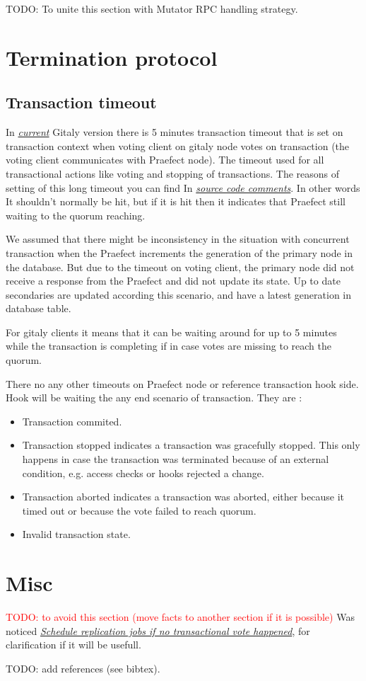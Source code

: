 \documentclass[acmlarge, screen, nonacm]{acmart}
\newcommand{\todo}[1]{\textcolor{red}{TODO: #1}}
\begin{document}
TODO: To unite this section with Mutator RPC handling strategy.

\section{Termination protocol}
\subsection{Transaction timeout}
In \emph{\href{https://gitlab.com/gitlab-org/gitaly/-/tags/v14.0.0-rc1}{ current}} 
Gitaly version there is 5 minutes transaction timeout that is set on transaction 
context when voting client on gitaly node votes on transaction (the voting client 
communicates with Praefect node).
The timeout used for all transactional actions like voting and stopping of transactions.
 The reasons of setting of this long timeout you can find 
In \emph{\href{https://gitlab.com/gitlab-org/gitaly/-/blob/master/internal/gitaly/transaction/manager.go\#L21}{ source code comments}}. 
In other words It shouldn't normally be hit, but if it is hit then it indicates that Praefect still waiting to the quorum reaching. 

We assumed that there might be inconsistency in the situation with concurrent transaction when the Praefect 
increments the generation of the primary node in the database. But due to the timeout on voting client, 
the primary node did not receive a response from the Praefect and did not update its state. 
Up to date secondaries are updated according this scenario, and have a latest generation in database table. 

For gitaly clients it means that it can be waiting around for up to 5 minutes while the transaction 
is completing if in case votes are missing to reach the quorum.

There no any other timeouts on Praefect node or reference transaction hook side. 
Hook will be waiting the any end scenario of transaction. They are :

\begin{itemize}
\item Transaction commited.
\item Transaction stopped indicates a transaction was gracefully stopped. 
This only happens in case the transaction was terminated because of an external condition, e.g. access checks or hooks rejected a change.
\item Transaction aborted indicates a transaction was aborted, either because it timed out or because the vote failed to reach quorum.
\item Invalid transaction state.
\end{itemize}


\section{Misc}
\todo{to avoid this section (move facts to another section if it is possible)}
  Was noticed
  \emph{\href{https://gitlab.com/gitlab-org/gitaly/-/issues/2466}{Schedule replication jobs if no transactional vote happened}},
  for clarification if it will be usefull.

TODO: add references (see bibtex).
\end{document}
